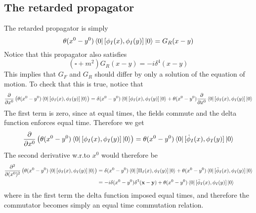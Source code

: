 \documentclass[11pt, notitlepage]{report}
\newcommand{\del}{\partial}
\numberwithin{equation}{section}
\begin{document}
    \subsection{The retarded propagator}
    The retarded propagator is simply 
    \begin{equation*}
        \theta(x^0 - y^0)\bra{0}[\phi_I(x), \phi_I(y) ]\ket{0} = G_R(x-y)
    \end{equation*}
    Notice that this propagator also satisfies 
    \begin{equation*}
        (\square + m^2)G_R(x-y) = -i\delta^4(x-y)
    \end{equation*}
    This implies that \(G_F\) and \(G_R\) should differ by only a solution of the equation of motion. To check that this is true, notice that 
    \begin{equation*}
        \frac{\del}{\del x^0} \left(\theta(x^0 - y^0)\bra{0}[\phi_I(x), \phi_I(y) ]\ket{0}\right) = \delta(x^0 - y^0)\bra{0}[\phi_I(x), \phi_I(y) ]\ket{0} + \theta(x^0 - y^0)\frac{\del}{\del x^0} \bra{0}[\phi_I(x), \phi_I(y) ]\ket{0}
    \end{equation*}
    The first term is zero, since at equal times, the fields commute and the delta function enforces equal time. 
    Therefore we get 
    \begin{equation*}
        \frac{\del}{\del x^0} \left(\theta(x^0 - y^0)\bra{0}[\phi_I(x), \phi_I(y) ]\ket{0}\right) = \theta(x^0 - y^0) \bra{0}[\dot{\phi}_I(x), \phi_I(y) ]\ket{0}
    \end{equation*}
    The second derivative w.r.to \(x^0\) would therefore be 
    \begin{align*}
        \frac{\del^2}{\del (x^0)^2} \left(\theta(x^0 - y^0)\bra{0}[\phi_I(x), \phi_I(y) ]\ket{0}\right) &= \delta(x^0 - y^0) \bra{0}[\Pi_I(x), \phi_I(y) ]\ket{0} + \theta(x^0 - y^0) \bra{0}[\ddot{\phi}_I(x), \phi_I(y) ]\ket{0} \\
        &= -i\delta(x^0 - y^0)\delta^3(\textbf{x} - \textbf{y}) + \theta(x^0 - y^0) \bra{0}[\ddot{\phi}_I(x), \phi_I(y) ]\ket{0} 
    \end{align*}
    where in the first term the delta function imposed equal times, and therefore the commutator becomes simply an equal time commutation relation. \\
\end{document}

